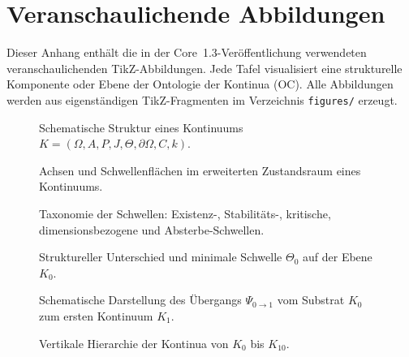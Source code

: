 
\section{Veranschaulichende Abbildungen}
\label{sec:figures}

Dieser Anhang enthält die in der Core~1.3-Veröffentlichung verwendeten
veranschaulichenden TikZ-Abbildungen. Jede Tafel visualisiert eine
strukturelle Komponente oder Ebene der Ontologie der Kontinua (OC). Alle
Abbildungen werden aus eigenständigen TikZ-Fragmenten im Verzeichnis
\texttt{figures/} erzeugt.

\begin{figure}[p]
  \centering
  
  \caption{Schematische Struktur eines Kontinuums
           \(K = (\Omega, A, P, J, \Theta, \partial\Omega, C, k)\).}
  \label{fig:continua-structure}
\end{figure}

\begin{figure}[p]
  \centering
  
  \caption{Achsen und Schwellenflächen im erweiterten Zustandsraum eines
           Kontinuums.}
  \label{fig:axes-thresholds}
\end{figure}

\begin{figure}[p]
  \centering
  
  \caption{Taxonomie der Schwellen: Existenz-, Stabilitäts-, kritische,
           dimensionsbezogene und Absterbe-Schwellen.}
  \label{fig:thresholds-taxonomy}
\end{figure}

\begin{figure}[p]
  \centering
  
  \caption{Struktureller Unterschied und minimale Schwelle
           \texorpdfstring{\(\Theta_0\)}{\Theta_0} auf der Ebene
           \texorpdfstring{\(K_0\)}{K_0}.}
  \label{fig:delta-threshold-k0}
\end{figure}

\begin{figure}[p]
  \centering
  
  \caption{Schematische Darstellung des Übergangs
           \(\Psi_{0\to 1}\) vom Substrat
           \(K_0\) zum ersten Kontinuum \(K_1\).}
  \label{fig:k0-k1-transition}
\end{figure}

\begin{figure}[p]
  \centering
  
  \caption{Vertikale Hierarchie der Kontinua von
           \texorpdfstring{\(K_0\)}{K_0} bis \(K_{10}\).}
  \label{fig:levels-hierarchy}
\end{figure}

